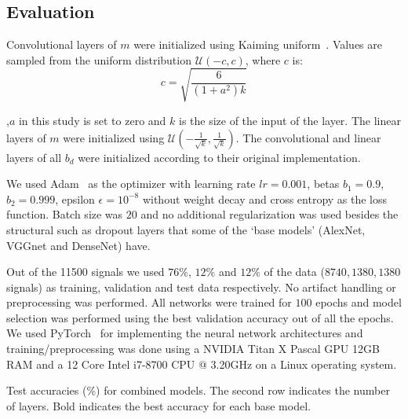\documentclass[conference]{IEEEtran}
\begin{document}
\subsection{Evaluation}
Convolutional layers of $m$ were initialized using Kaiming uniform~\cite{he2015delving}. Values are sampled from the uniform distribution $\mathcal{U}(-c, c)$, where $c$ is:
\begin{equation}
	c = \sqrt{\frac{6}{(1 + a^2) k}}
\end{equation}

\noindent
,$a$ in this study is set to zero and $k$ is the size of the input of the layer.
The linear layers of $m$ were initialized using $\mathcal{U}(-\frac{1}{\sqrt{k}},\frac{1}{\sqrt{k}})$.
The convolutional and linear layers of all $b_d$ were initialized according to their original implementation.

We used Adam~\cite{kingma2014adam} as the optimizer with learning rate $lr=0.001$, betas $b_1=0.9$, $b_2=0.999$, epsilon $\epsilon=10^{-8}$ without weight decay and cross entropy as the loss function.
Batch size was $20$ and no additional regularization was used besides the structural such as dropout layers that some of the `base models' (AlexNet, VGGnet and DenseNet) have.

Out of the 11500 signals we used $76\%$, $12\%$ and $12\%$ of the data ($8740,1380,1380$ signals) as training, validation and test data respectively.
No artifact handling or preprocessing was performed.
All networks were trained for $100$ epochs and model selection was performed using the best validation accuracy out of all the epochs.
We used PyTorch~\cite{paszke2017automatic} for implementing the neural network architectures and training/preprocessing was done using a NVIDIA Titan X Pascal GPU 12GB RAM and a 12 Core Intel i7-8700 CPU @ 3.20GHz on a Linux operating system.

\begin{table*}[!t]
	\caption{Test accuracies (\%) for combined models.
	The second row indicates the number of layers.
	Bold indicates the best accuracy for each base model.}
	\label{table:results}
	\begin{minipage}{\textwidth}
		\setlength\tabcolsep{0.6pt}
		\centering
		
	\end{minipage}
\end{table*}
\end{document}
